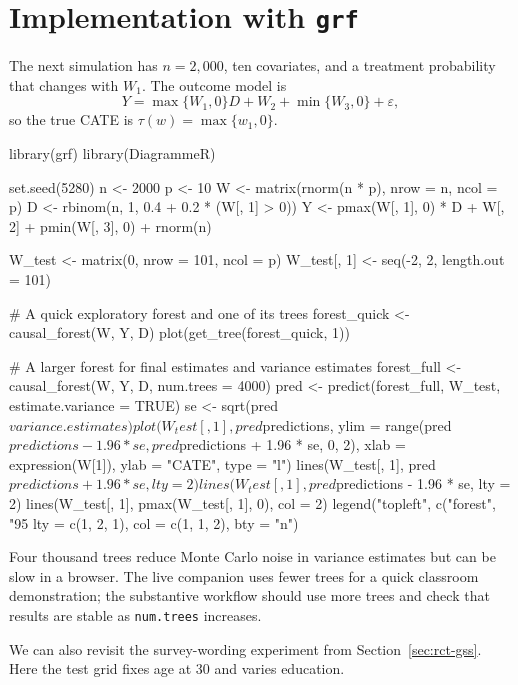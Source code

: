 \section{Implementation with \texttt{grf}}
\label{sec:cf-implementation}

The next simulation has $n=2{,}000$, ten covariates, and a treatment probability
that changes with $W_1$.  The outcome model is
\[
  Y=\max\{W_1,0\}D+W_2+\min\{W_3,0\}+\varepsilon,
\]
so the true CATE is $\tau(w)=\max\{w_1,0\}$.

\begin{rcode}
library(grf)
library(DiagrammeR)

set.seed(5280)
n <- 2000
p <- 10
W <- matrix(rnorm(n * p), nrow = n, ncol = p)
D <- rbinom(n, 1, 0.4 + 0.2 * (W[, 1] > 0))
Y <- pmax(W[, 1], 0) * D + W[, 2] + pmin(W[, 3], 0) + rnorm(n)

W_test <- matrix(0, nrow = 101, ncol = p)
W_test[, 1] <- seq(-2, 2, length.out = 101)

# A quick exploratory forest and one of its trees
forest_quick <- causal_forest(W, Y, D)
plot(get_tree(forest_quick, 1))

# A larger forest for final estimates and variance estimates
forest_full <- causal_forest(W, Y, D, num.trees = 4000)
pred <- predict(forest_full, W_test, estimate.variance = TRUE)
se <- sqrt(pred$variance.estimates)

plot(W_test[, 1], pred$predictions,
     ylim = range(pred$predictions - 1.96 * se,
                  pred$predictions + 1.96 * se, 0, 2),
     xlab = expression(W[1]), ylab = "CATE", type = "l")
lines(W_test[, 1], pred$predictions + 1.96 * se, lty = 2)
lines(W_test[, 1], pred$predictions - 1.96 * se, lty = 2)
lines(W_test[, 1], pmax(W_test[, 1], 0), col = 2)
legend("topleft", c("forest", "95%
       lty = c(1, 2, 1), col = c(1, 1, 2), bty = "n")
\end{rcode}

Four thousand trees reduce Monte Carlo noise in variance estimates but can be slow
in a browser.  The live companion uses fewer trees for a quick classroom
demonstration; the substantive workflow should use more trees and check that results
are stable as \texttt{num.trees} increases.

We can also revisit the survey-wording experiment from
Section~\ref{sec:rct-gss}.  Here the test grid fixes age at 30 and varies education.

